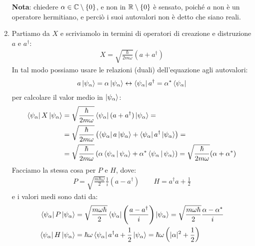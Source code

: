 \documentclass[../../FisicaTeorica.tex]{subfiles}
\begin{document}
\begin{enumerate}
\textbf{Nota}: chiedere $\alpha \in \mathbb{C}\setminus \{0\}$, e non in $\mathbb{R}\setminus \{0\}$ è sensato, poiché $a$ non è un operatore hermitiano, e perciò i suoi autovalori non è detto che siano reali.
\item Partiamo da $X$ e scriviamolo in termini di operatori di creazione e distruzione $a$ e $a^\dag$:
\begin{align}
X = \sqrt{\frac{\hbar}{2m\omega}}(a+a^\dag)
\label{eqn:Xadag}
\end{align}
 In tal modo possiamo usare le relazioni (duali) dell'equazione agli autovalori:
\begin{align}
a\Ket{\psi_\alpha} = \alpha \Ket{\psi_\alpha} \leftrightarrow \Bra{\psi_\alpha} a^\dag = \alpha^* \Bra{\psi_\alpha}
\label{eqn:autovalori_dual}
\end{align}
per calcolare il valor medio in $\Ket{\psi_\alpha}$:
\begin{align*}
\Bra{\psi_\alpha}X\Ket{\psi_\alpha} &= \sqrt{\frac{\hbar}{2m\omega}}\Bra{\psi_\alpha}(a+a^\dag) \Ket{\psi_\alpha}=\\
&=\sqrt{\frac{\hbar}{2m\omega}}\left(\Bra{\psi_\alpha}a\Ket{\psi_\alpha}+\Bra{\psi_\alpha}a^\dag \Ket{\psi_\alpha}\right) =\\
&= \sqrt{\frac{\hbar}{2m\omega}} \left(\alpha \Braket{\psi_\alpha|\psi_\alpha} + \alpha^* \Braket{\psi_\alpha|\psi_\alpha}\right)
=\sqrt{\frac{\hbar}{2m\omega}}(\alpha + \alpha^*)
\end{align*}
Facciamo la stessa cosa per $P$ e $H$, dove:
\begin{align}
P = \sqrt{\frac{m\hbar \omega}{2}}\frac{1}{i}(a-a^\dag) \qquad H = a^\dag a + \frac{1}{2}
\label{eqn:Padag}
\end{align}
e i valori medi sono dati da:
\begin{align*}
\Bra{\psi_\alpha}P\Ket{\psi_\alpha} &= \sqrt{\frac{m\omega\hbar}{2}}\Bra{\psi_\alpha}\left(\frac{a-a^\dag}{i}\right)\Ket{\psi_\alpha} = \sqrt{\frac{m\omega\hbar}{2}}\frac{\alpha-\alpha^*}{i}\\
\Bra{\psi_\alpha}H\Ket{\psi_\alpha}&=\hbar \omega \Bra{\psi_\alpha}a^\dag a + \frac{1}{2}\Ket{\psi_\alpha} = \hbar \omega \left(|\alpha|^2 + \frac{1}{2}\right)
\end{align*}


\end{enumerate}
\end{document}
